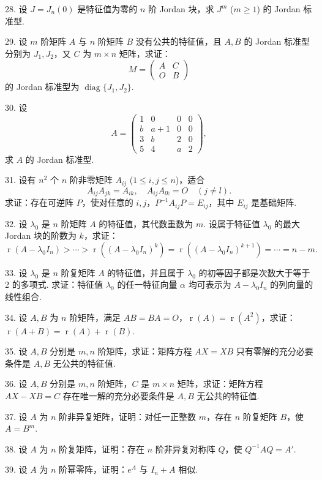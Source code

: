 \documentclass[UTF8,12pt,a4paper,fontset=fandol]{ctexart}
\begin{document}
28. 设 $J=J_n(0)$ 是特征值为零的 $n$ 阶 Jordan 块，求 $J^m$ ($m\geq 1$) 的 Jordan 标准型.

29. 设 $m$ 阶矩阵 $A$ 与 $n$ 阶矩阵 $B$ 没有公共的特征值，且 $A,B$ 的 Jordan 标准型分别为 $J_1,J_2$，又 $C$ 为 $m\times n$ 矩阵，求证：
\[
M=\left(\begin{array}{cc}
A & C\\
O & B
\end{array}\right)
\]
的 Jordan 标准型为 $\operatorname{diag}\{J_1,J_2\}$.

30. 设
\[
A=\left(\begin{array}{cccc}
1 & 0 & 0 & 0\\
b & a+1 & 0 & 0\\
3 & b & 2 & 0\\
5 & 4 & a & 2
\end{array}\right),
\]
求 $A$ 的 Jordan 标准型.

31. 设有 $n^2$ 个 $n$ 阶非零矩阵 $A_{ij}$ ($1\leq i,j\leq n$)，适合
\[
A_{ij}A_{jk}=A_{ik},\quad A_{ij}A_{lk}=O\quad (j\ne l).
\]
求证：存在可逆阵 $P$，使对任意的 $i,j$，$P^{-1}A_{ij}P=E_{ij}$，其中 $E_{ij}$ 是基础矩阵.

32. 设 $\lambda_0$ 是 $n$ 阶矩阵 $A$ 的特征值，其代数重数为 $m$. 设属于特征值 $\lambda_0$ 的最大 Jordan 块的阶数为 $k$，求证：
\[
\operatorname{r}(A-\lambda_0I_n)>\cdots>\operatorname{r}((A-\lambda_0I_n)^k)=\operatorname{r}((A-\lambda_0I_n)^{k+1})=\cdots=n-m.
\]

33. 设 $\lambda_0$ 是 $n$ 阶复矩阵 $A$ 的特征值，并且属于 $\lambda_0$ 的初等因子都是次数大于等于 2 的多项式. 求证：特征值 $\lambda_0$ 的任一特征向量 $\alpha$ 均可表示为 $A-\lambda_0I_n$ 的列向量的线性组合.

34. 设 $A,B$ 为 $n$ 阶矩阵，满足 $AB=BA=O$，$\operatorname{r}(A)=\operatorname{r}(A^2)$，求证：$\operatorname{r}(A+B)=\operatorname{r}(A)+\operatorname{r}(B)$.

35. 设 $A,B$ 分别是 $m,n$ 阶矩阵，求证：矩阵方程 $AX=XB$ 只有零解的充分必要条件是 $A,B$ 无公共的特征值.

36. 设 $A,B$ 分别是 $m,n$ 阶矩阵，$C$ 是 $m\times n$ 矩阵，求证：矩阵方程 $AX-XB=C$ 存在唯一解的充分必要条件是 $A,B$ 无公共的特征值.

37. 设 $A$ 为 $n$ 阶非异复矩阵，证明：对任一正整数 $m$，存在 $n$ 阶复矩阵 $B$，使 $A=B^m$.

38. 设 $A$ 为 $n$ 阶复矩阵，证明：存在 $n$ 阶非异复对称阵 $Q$，使 $Q^{-1}AQ=A'$.

39. 设 $A$ 为 $n$ 阶幂零阵，证明：$e^A$ 与 $I_n+A$ 相似.
\end{document}

